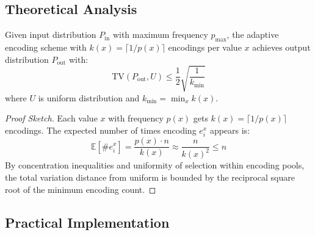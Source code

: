 \subsection{Theoretical Analysis}

\begin{theorem}
Given input distribution $P_{\text{in}}$ with maximum frequency $p_{\max}$, the adaptive encoding scheme with $k(x) = \lceil 1/p(x) \rceil$ encodings per value $x$ achieves output distribution $P_{\text{out}}$ with:
$$\text{TV}(P_{\text{out}}, U) \leq \frac{1}{2}\sqrt{\frac{1}{k_{\min}}}$$
where $U$ is uniform distribution and $k_{\min} = \min_x k(x)$.
\end{theorem}

\begin{proof}[Proof Sketch]
Each value $x$ with frequency $p(x)$ gets $k(x) = \lceil 1/p(x) \rceil$ encodings. The expected number of times encoding $e_i^x$ appears is:
$$\mathbb{E}[\#e_i^x] = \frac{p(x) \cdot n}{k(x)} \approx \frac{n}{k(x)^2} \leq n$$
By concentration inequalities and uniformity of selection within encoding pools, the total variation distance from uniform is bounded by the reciprocal square root of the minimum encoding count.
\end{proof}

\subsection{Practical Implementation}


